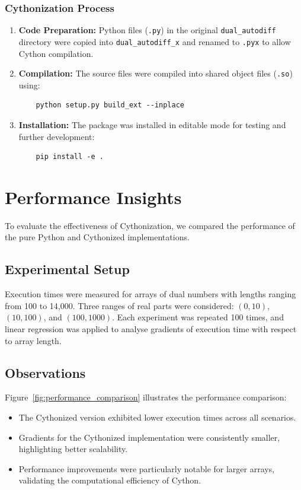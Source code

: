 \documentclass[a4paper,12pt]{article}
\begin{document}
\subsubsection{Cythonization Process}
\begin{enumerate}
    \item \textbf{Code Preparation:} 
    Python files (\texttt{.py}) in the original \texttt{dual\_autodiff} directory were copied into \texttt{dual\_autodiff\_x} and renamed to \texttt{.pyx} to allow Cython compilation.
    
    \item \textbf{Compilation:} 
    The source files were compiled into shared object files (\texttt{.so}) using:
    \begin{verbatim}
    python setup.py build_ext --inplace
    \end{verbatim}
    
    \item \textbf{Installation:} 
    The package was installed in editable mode for testing and further development:
    \begin{verbatim}
    pip install -e .
    \end{verbatim}
\end{enumerate}

\section{Performance Insights}
To evaluate the effectiveness of Cythonization, we compared the performance of the pure Python and Cythonized implementations.

\subsection{Experimental Setup}
Execution times were measured for arrays of dual numbers with lengths ranging from 100 to 14,000. Three ranges of real parts were considered: \((0,10)\), \((10,100)\), and \((100,1000)\). Each experiment was repeated 100 times, and linear regression was applied to analyse gradients of execution time with respect to array length.

\subsection{Observations}
Figure~\ref{fig:performance_comparison} illustrates the performance comparison:
\begin{itemize}
    \item The Cythonized version exhibited lower execution times across all scenarios.
    \item Gradients for the Cythonized implementation were consistently smaller, highlighting better scalability.
    \item Performance improvements were particularly notable for larger arrays, validating the computational efficiency of Cython.
\end{itemize}
\end{document}
